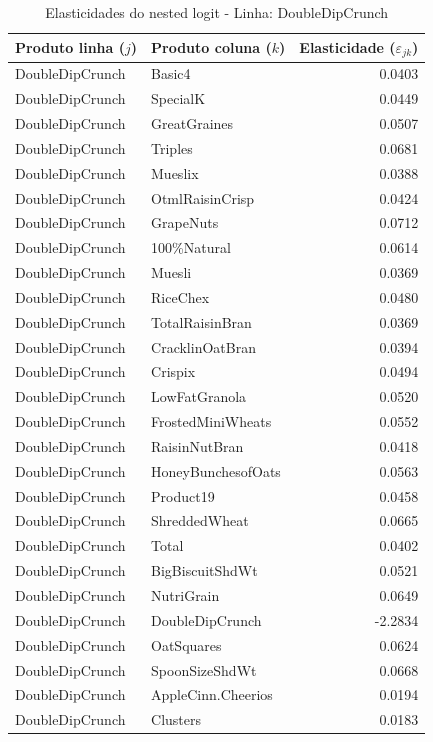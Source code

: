 \begingroup
\begin{table}[H]
\centering
\caption{Elasticidades do nested logit - Linha: DoubleDipCrunch}
\label{tab:elas-nested-doubledipcrunch}
\small
\begin{tabular}{llr}
\toprule
Produto linha ($j$) & Produto coluna ($k$) & Elasticidade ($\varepsilon_{jk}$) \\
\midrule
DoubleDipCrunch & Basic4 & 0.0403 \\
DoubleDipCrunch & SpecialK & 0.0449 \\
DoubleDipCrunch & GreatGraines & 0.0507 \\
DoubleDipCrunch & Triples & 0.0681 \\
DoubleDipCrunch & Mueslix & 0.0388 \\
DoubleDipCrunch & OtmlRaisinCrisp & 0.0424 \\
DoubleDipCrunch & GrapeNuts & 0.0712 \\
DoubleDipCrunch & 100\%Natural & 0.0614 \\
DoubleDipCrunch & Muesli & 0.0369 \\
DoubleDipCrunch & RiceChex & 0.0480 \\
DoubleDipCrunch & TotalRaisinBran & 0.0369 \\
DoubleDipCrunch & CracklinOatBran & 0.0394 \\
DoubleDipCrunch & Crispix & 0.0494 \\
DoubleDipCrunch & LowFatGranola & 0.0520 \\
DoubleDipCrunch & FrostedMiniWheats & 0.0552 \\
DoubleDipCrunch & RaisinNutBran & 0.0418 \\
DoubleDipCrunch & HoneyBunchesofOats & 0.0563 \\
DoubleDipCrunch & Product19 & 0.0458 \\
DoubleDipCrunch & ShreddedWheat & 0.0665 \\
DoubleDipCrunch & Total & 0.0402 \\
DoubleDipCrunch & BigBiscuitShdWt & 0.0521 \\
DoubleDipCrunch & NutriGrain & 0.0649 \\
DoubleDipCrunch & DoubleDipCrunch & -2.2834 \\
DoubleDipCrunch & OatSquares & 0.0624 \\
DoubleDipCrunch & SpoonSizeShdWt & 0.0668 \\
DoubleDipCrunch & AppleCinn.Cheerios & 0.0194 \\
DoubleDipCrunch & Clusters & 0.0183 \\

\end{tabular}
\end{table}
